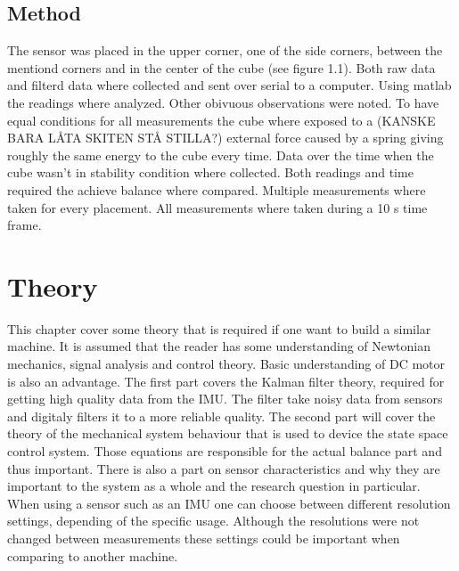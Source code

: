 \documentclass[a4paper,11pt]{kth-mag}
\begin{document}
\section{Method}
The sensor was placed in the upper corner, one of the side corners, between the mentiond corners and in the center of the cube (see figure 1.1). Both raw data and filterd data 
where collected and sent over serial to a computer. Using matlab the readings where analyzed. Other obivuous observations were noted. To have equal conditions for all measurements the cube where exposed to a (KANSKE BARA LÅTA SKITEN STÅ STILLA?)
external force caused by a spring giving roughly the same energy to the cube every time. Data over the time when the cube wasn't in stability condition where collected. 
Both readings and time required the achieve balance where compared. Multiple measurements where taken for every placement.
All measurements where taken during a 10 s time frame.

\chapter{Theory}
This chapter cover some theory that is required if one want to build a similar machine. It is assumed that the reader has some 
understanding of Newtonian mechanics, signal analysis and control theory. Basic understanding of DC motor is also an advantage.  
The first part covers the Kalman filter theory, required for getting high quality data from the IMU. The filter take noisy data from sensors and digitaly filters it to a more reliable quality. The second part will cover 
the theory of the mechanical system behaviour that is used to device the state space control system. Those equations are responsible for the actual balance part and thus important. There is also a part on sensor characteristics and why they are important 
to the system as a whole and the research question in particular. When using a sensor such as an IMU one can choose between different resolution settings, depending of the specific usage. Although the resolutions were not changed between measurements these settings could be important when comparing to another machine.
\end{document}
